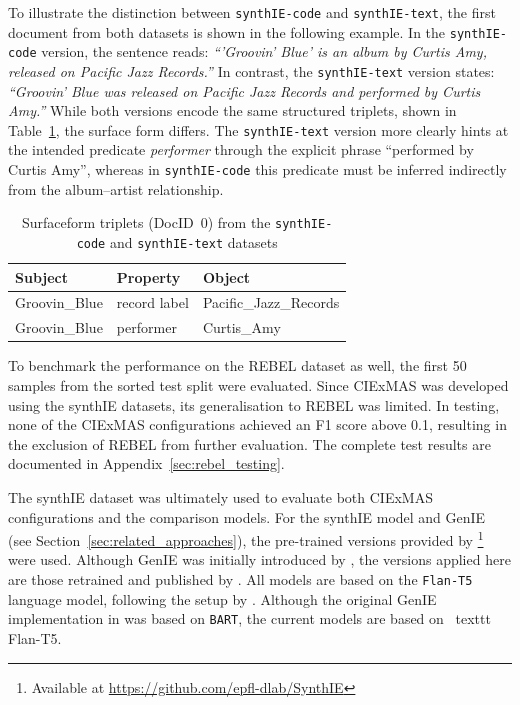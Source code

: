 \documentclass[a4paper,oneside,bibliography=totoc]{scrbook}
\begin{document}
To illustrate the distinction between \texttt{synthIE-code} and \texttt{synthIE-text}, the first document from both datasets is shown in the following example. In the \texttt{synthIE-code} version, the sentence reads: \emph{\enquote{'Groovin' Blue' is an album by Curtis Amy, released on Pacific Jazz Records.}} In contrast, the \texttt{synthIE-text} version states: \emph{\enquote{Groovin' Blue was released on Pacific Jazz Records and performed by Curtis Amy.}} While both versions encode the same structured triplets, shown in Table~\ref{tab:triple-example}, the surface form differs. The \texttt{synthIE-text} version more clearly hints at the intended predicate \emph{performer} through the explicit phrase \enquote{performed by Curtis Amy}, whereas in \texttt{synthIE-code} this predicate must be inferred indirectly from the album–artist relationship.

\begin{table}[h]
  \centering
  \begin{tabular}{l l l}
    \toprule
    \textbf{Subject} & \textbf{Property} & \textbf{Object}        \\
    \midrule
    Groovin\_Blue    & record label      & Pacific\_Jazz\_Records \\
    Groovin\_Blue    & performer         & Curtis\_Amy            \\
    \bottomrule
  \end{tabular}
  \caption{Surfaceform triplets (DocID~0) from the \texttt{synthIE-code} and \texttt{synthIE-text} datasets}
  \label{tab:triple-example}
\end{table}

To benchmark the performance on the REBEL dataset as well, the first 50 samples from the sorted test split were evaluated. Since CIExMAS was developed using the synthIE datasets, its generalisation to REBEL was limited. In testing, none of the CIExMAS configurations achieved an F1 score above 0.1, resulting in the exclusion of REBEL from further evaluation. The complete test results are documented in Appendix~\ref{sec:rebel_testing}.

The synthIE dataset was ultimately used to evaluate both CIExMAS configurations and the comparison models. For the synthIE model and GenIE (see Section~\ref{sec:related_approaches}), the pre-trained versions provided by \citet{Josifoski2023}\footnote{Available at \url{https://github.com/epfl-dlab/SynthIE}} were used. Although GenIE was initially introduced by \citet{Josifoski2021}, the versions applied here are those retrained and published by \citet{Josifoski2023}. All models are based on the \texttt{Flan-T5} language model, following the setup by \citet{Josifoski2023}. Although the original GenIE implementation in \citet{Josifoski2021} was based on \texttt{BART}, the current models are based on \ texttt {Flan-T5}.
\end{document}
